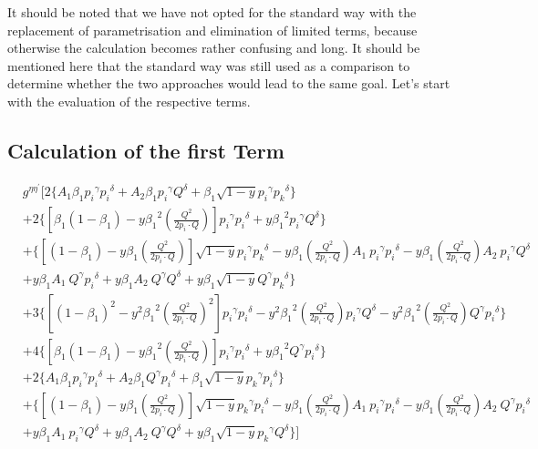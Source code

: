 It should be noted that we have not opted for the standard way with the replacement of parametrisation and elimination of limited terms, because otherwise the calculation becomes rather confusing and long. It should be mentioned here that the standard way was still used as a comparison to determine whether the two approaches would lead to the same goal. Let's start with the evaluation of the respective terms.

\subsection*{Calculation of the first Term}

\begin{equation}
\begin{split} 
& g^{{{\eta}}{{\eta}^{\prime}}}[2\lbrace A_1\beta_1 {p_i}^{{\gamma}}{{p_i}^{{\delta}}}+A_2\beta_1 {p_i}^{{\gamma}}{{Q}^{{\delta}}}+\beta_1 \sqrt{1-y}{p_i}^{{\gamma}}{{p_k}^{{\delta}}} \rbrace \\&
+2\lbrace [\beta_1(1-\beta_1)-y {\beta_1}^2 (\frac{Q^2}{2p_i \cdot Q})] {p_i}^{{\gamma}}{p_i}^{{\delta}}+y {\beta_1}^2 {p_i}^{{\gamma}}{Q}^{{\delta}} \rbrace\\
&+\lbrace [(1-\beta_1)-y\beta_1 (\frac{Q^2}{2p_i \cdot Q})] \sqrt{1-y}{p_i}^{{\gamma}}{{p_k}^{{\delta}}}-y {\beta_1} (\frac{Q^2}{2p_i \cdot Q}) A_1 \:{p_i}^{{\gamma}}{p_i}^{{\delta}}
-y {\beta_1} (\frac{Q^2}{2p_i \cdot Q}) A_2\: {p_i}^{{\gamma}}{Q}^{{\delta}}\\
&+y {\beta_1} A_1 \:{Q}^{{\gamma}}{p_i}^{{\delta}}+y {\beta_1} A_2 \:{Q}^{{\gamma}}{Q}^{{\delta}}+y {\beta_1}\sqrt{1-y}{Q}^{{\gamma}}{{p_k}^{{\delta}}} \rbrace \\
&+3\lbrace [(1-\beta_1)^2-y^2 {\beta_1}^2 (\frac{Q^2}{2p_i \cdot Q})^2] {p_i}^{{\gamma}}{p_i}^{{\delta}}-y^2 {\beta_1}^2 (\frac{Q^2}{2p_i \cdot Q}){p_i}^{{\gamma}}{Q}^{{\delta}}-y^2 {\beta_1}^2 (\frac{Q^2}{2p_i \cdot Q}){Q}^{{\gamma}}{p_i}^{{\delta}} \rbrace\\
&+4\lbrace [\beta_1(1-\beta_1)-y {\beta_1}^2 (\frac{Q^2}{2p_i \cdot Q})] {p_i}^{{\gamma}}{p_i}^{{\delta}}+y {\beta_1}^2 {Q}^{{\gamma}}{p_i}^{{\delta}} \rbrace\\
&+2\lbrace A_1\beta_1 {p_i}^{{\gamma}}{{p_i}^{{\delta}}}+A_2\beta_1 {Q}^{{\gamma}}{{p_i}^{{\delta}}}+\beta_1 \sqrt{1-y}{p_k}^{{\gamma}}{{p_i}^{{\delta}}} \rbrace \\
&+\lbrace [(1-\beta_1)-y\beta_1 (\frac{Q^2}{2p_i \cdot Q})] \sqrt{1-y}{p_k}^{{\gamma}}{{p_i}^{{\delta}}}-y {\beta_1} (\frac{Q^2}{2p_i \cdot Q}) A_1 \:{p_i}^{{\gamma}}{p_i}^{{\delta}}
-y {\beta_1} (\frac{Q^2}{2p_i \cdot Q}) A_2\: {Q}^{{\gamma}}{p_i}^{{\delta}}\\
&+y {\beta_1} A_1 \:{p_i}^{{\gamma}}{Q}^{{\delta}}+y {\beta_1} A_2 \:{Q}^{{\gamma}}{Q}^{{\delta}}+y {\beta_1}\sqrt{1-y}{p_k}^{{\gamma}}{{Q}^{{\delta}}} \rbrace]\\
\end{split}
\end{equation}

